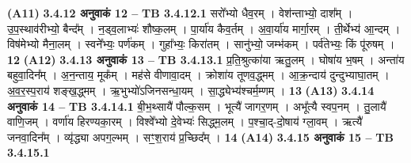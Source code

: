 \documentclass[17pt]{extarticle}
\begin{document}
{{{{{{{{{{{{{{{{{{{                                     \textbf{(A11)} \newline \newline
                \textbf{ 3.4.12    अनुवाकं   12 –} \newline
                                \textbf{ TB 3.4.12.1} \newline
                  सरो᳚भ्यो धैव॒रम् । वेश॑न्ताभ्यो॒ दाश᳚म् । उ॒प॒स्थाव॑रीभ्यो॒ बैन्द᳚म् । न॒ड्व॒लाभ्यः॑ शौष्क॒लम् । पा॒र्या॑य कैव॒र्तम् । अ॒वा॒र्या॑य मार्गा॒रम् । ती॒र्थेभ्य॑ आ॒न्दम् । विष॑मेभ्यो मैना॒लम् । स्वने᳚भ्यः॒ पर्ण॑कम् । गुहा᳚भ्यः॒ किरा॑तम् । सानु॑भ्यो॒ जम्भ॑कम् । पर्व॑तेभ्यः॒ किं पू॑रुषम् । \textbf{ 12} \newline
                  \newline
                                     \textbf{(A12)} \newline \newline
                \textbf{ 3.4.13    अनुवाकं   13 –} \newline
                                \textbf{ TB 3.4.13.1} \newline
                  प्र॒ति॒श्रुत्का॑या ऋतु॒लम् । घोषा॑य भ॒षम् । अन्ता॑य बहुवा॒दिन᳚म् । अ॒न॒न्ताय॒ मूक᳚म् । मह॑से वीणावा॒दम् । क्रोशा॑य तूणव॒द्ध्मम् । आ॒क्र॒न्दाय॑ दुन्दुभ्याघा॒तम् । अ॒व॒र॒स्प॒राय॑ शङ्ख॒द्ध्मम् । ऋ॒भुभ्यो॑ऽजिनसन्धा॒यम् । सा॒द्ध्येभ्य॑श्चर्म॒म्णम् । \textbf{ 13} \newline
                  \newline
                                     \textbf{(A13)} \newline \newline
                \textbf{ 3.4.14    अनुवाकं   14 –} \newline
                                \textbf{ TB 3.4.14.1} \newline
                  बी॒भ॒थ्सायै॑ पौल्क॒सम् । भूत्यै॑ जागर॒णम् । अभू᳚त्यै स्वप॒नम् । तु॒लायै॑ वाणि॒जम् । वर्णा॑य हिरण्यका॒रम् । विश्वे᳚भ्यो दे॒वेभ्यः॑ सिद्ध्म॒लम् । प॒श्चा॒द्-दो॒षाय॑ ग्ला॒वम् । ऋत्यै॑ जनवा॒दिन᳚म् । व्यृ॑द्ध्या अपग॒ल्भम् । सꣳ॒॒श॒राय॑ प्र॒च्छिद᳚म् । \textbf{ 14} \newline
                  \newline
                                     \textbf{(A14)} \newline \newline
                \textbf{ 3.4.15    अनुवाकं   15 –} \newline
                                \textbf{ TB 3.4.15.1} \newline
}}}}}}}}}}}}}}}}}}}
\end{document}
